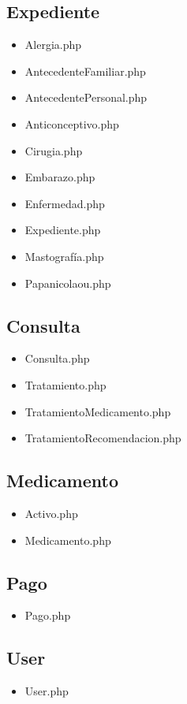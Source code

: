		\subsection{Expediente}
		\begin{itemize}
			\item Alergia.php
			\item AntecedenteFamiliar.php
			\item AntecedentePersonal.php
			\item Anticonceptivo.php
			\item Cirugia.php
			\item Embarazo.php
			\item Enfermedad.php
			\item Expediente.php
			\item Mastografía.php
			\item Papanicolaou.php
		\end{itemize}				
		
		\subsection{Consulta}
		\begin{itemize}
			\item Consulta.php
			\item Tratamiento.php
			\item TratamientoMedicamento.php
			\item TratamientoRecomendacion.php
		\end{itemize}
		\subsection{Medicamento}
		\begin{itemize}
			\item Activo.php
			\item Medicamento.php
		\end{itemize}
		\subsection{Pago}
		\begin{itemize}
			\item Pago.php
		\end{itemize}
		\subsection{User}
		\begin{itemize}
			\item User.php
		\end{itemize}
		
